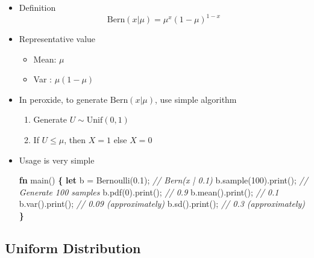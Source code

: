 \documentclass[]{book}
\newenvironment{Shaded}{\begin{snugshade}}{\end{snugshade}}
\newcommand{\CommentTok}[1]{\textcolor[rgb]{0.56,0.35,0.01}{\textit{#1}}}
\newcommand{\DecValTok}[1]{\textcolor[rgb]{0.00,0.00,0.81}{#1}}
\newcommand{\KeywordTok}[1]{\textcolor[rgb]{0.13,0.29,0.53}{\textbf{#1}}}
\newcommand{\NormalTok}[1]{#1}
\newcommand{\OperatorTok}[1]{\textcolor[rgb]{0.81,0.36,0.00}{\textbf{#1}}}
\providecommand{\tightlist}{%
  \setlength{\itemsep}{0pt}\setlength{\parskip}{0pt}}
\begin{document}
\begin{itemize}
\item
  Definition
  \[\text{Bern}(x | \mu) = \mu^x (1-\mu)^{1-x}\]
\item
  Representative value

  \begin{itemize}
  \tightlist
  \item
    Mean: \(\mu\)
  \item
    Var : \(\mu(1 - \mu)\)
  \end{itemize}
\item
  In peroxide, to generate \(\text{Bern}(x | \mu)\), use simple algorithm

  \begin{enumerate}
  \def\labelenumi{\arabic{enumi}.}
  \tightlist
  \item
    Generate \(U \sim \text{Unif}(0, 1)\)
  \item
    If \(U \leq \mu\), then \(X = 1\) else \(X = 0\)
  \end{enumerate}
\item
  Usage is very simple

\begin{Shaded}
\begin{Highlighting}[]
\KeywordTok{fn}\NormalTok{ main() }\OperatorTok{\{}
    \KeywordTok{let}\NormalTok{ b = Bernoulli(}\DecValTok{0.1}\NormalTok{); }\CommentTok{// Bern(x | 0.1)}
\NormalTok{    b.sample(}\DecValTok{100}\NormalTok{).print();  }\CommentTok{// Generate 100 samples}
\NormalTok{    b.pdf(}\DecValTok{0}\NormalTok{).print();       }\CommentTok{// 0.9}
\NormalTok{    b.mean().print();       }\CommentTok{// 0.1}
\NormalTok{    b.var().print();        }\CommentTok{// 0.09 (approximately)}
\NormalTok{    b.sd().print();         }\CommentTok{// 0.3  (approximately)}
\OperatorTok{\}}
\end{Highlighting}
\end{Shaded}
\end{itemize}

\hypertarget{uniform-distribution}{%
\subsection{Uniform Distribution}\label{uniform-distribution}}
\end{document}
